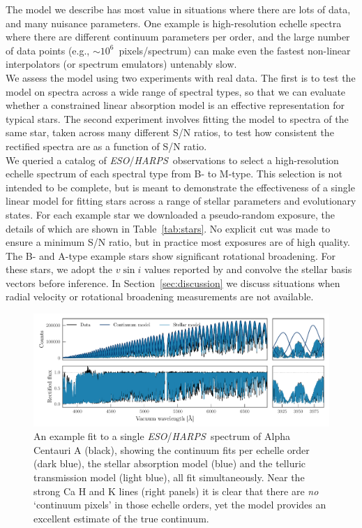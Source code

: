 \documentclass[modern]{aastex631}
\newcommand{\project}[1]{\textit{#1}}
\newcommand{\eso}{\project{ESO}}
\newcommand{\harps}{\project{HARPS}}
\newcommand{\todo}[1]{\textcolor{tab:red}{#1}}
\begin{document}
The model we describe has most value in situations where there are lots of data, and many nuisance parameters. One example is high-resolution echelle spectra where there are different continuum parameters per order, and the large number of data points (e.g., $\sim10^6$~pixels/spectrum) can make even the fastest non-linear interpolators (or spectrum emulators) untenably slow.\\

We assess the model using two experiments with real data. The first is to test the model on spectra across a wide range of spectral types, so that we can evaluate whether a constrained linear absorption model is an effective representation for typical stars. The second experiment involves fitting the model to spectra of the same star, taken across many different S/N ratios, to test how consistent the rectified spectra are as a function of S/N ratio.\\


We queried a catalog of \eso/\harps\ observations to select a high-resolution echelle spectrum of each spectral type from B- to M-type. This selection is not intended to be complete, but is meant to demonstrate the effectiveness of a single linear model for fitting stars across a range of stellar parameters and evolutionary states. For each example star we downloaded a pseudo-random exposure, the details of which are shown in Table~\ref{tab:stars}. No explicit cut was made to ensure a minimum S/N ratio, but in practice most exposures are of high quality. The B- and A-type example stars show significant rotational broadening. For these stars, we adopt the $v\sin{i}$ values reported by \citet{Someone} and convolve the stellar basis vectors before inference. In Section~\ref{sec:discussion} we discuss situations when radial velocity or rotational broadening measurements are not available.\\



\begin{figure}
    \includegraphics[width=\textwidth]{harps-alfCenA-example.pdf}
    \caption{An example fit to a single \eso/\harps\ spectrum of Alpha Centauri A (black), showing the continuum fits per echelle order (dark blue), the stellar absorption model (blue) and the \todo{telluric transmission model (light blue)}, all fit simultaneously. Near the strong Ca H and K lines (right panels) it is clear that there are \emph{no} `continuum pixels' in those echelle orders, yet the model provides an excellent estimate of the true continuum. \label{fig:alf-cen-A-example}}
\end{figure}
\end{document}
